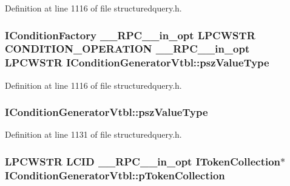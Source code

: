 Definition at line 1116 of file structuredquery.\+h.

\subsubsection[{\texorpdfstring{psz\+Value\+Type}{pszValueType}}]{ {\bf I\+Condition\+Factory} {\bf \+\_\+\+\_\+\+R\+P\+C\+\_\+\+\_\+in\+\_\+opt} {\bf L\+P\+C\+W\+S\+TR} {\bf C\+O\+N\+D\+I\+T\+I\+O\+N\+\_\+\+O\+P\+E\+R\+A\+T\+I\+ON} {\bf \+\_\+\+\_\+\+R\+P\+C\+\_\+\+\_\+in\+\_\+opt} {\bf L\+P\+C\+W\+S\+TR} I\+Condition\+Generator\+Vtbl\+::psz\+Value\+Type}\hypertarget{struct_i_condition_generator_vtbl_a29506597320052d30bf9d055f81867a5}{}\label{struct_i_condition_generator_vtbl_a29506597320052d30bf9d055f81867a5}


Definition at line 1116 of file structuredquery.\+h.

\subsubsection[{\texorpdfstring{psz\+Value\+Type}{pszValueType}}]{ I\+Condition\+Generator\+Vtbl\+::psz\+Value\+Type}\hypertarget{struct_i_condition_generator_vtbl_a4b4ea78570ce5ec535d6743fb3774d01}{}\label{struct_i_condition_generator_vtbl_a4b4ea78570ce5ec535d6743fb3774d01}


Definition at line 1131 of file structuredquery.\+h.

\subsubsection[{\texorpdfstring{p\+Token\+Collection}{pTokenCollection}}]{ {\bf L\+P\+C\+W\+S\+TR} {\bf L\+C\+ID} {\bf \+\_\+\+\_\+\+R\+P\+C\+\_\+\+\_\+in\+\_\+opt} {\bf I\+Token\+Collection}$\ast$ I\+Condition\+Generator\+Vtbl\+::p\+Token\+Collection}\hypertarget{struct_i_condition_generator_vtbl_a7d60355ecfbbc069adb46708e36deb71}{}\label{struct_i_condition_generator_vtbl_a7d60355ecfbbc069adb46708e36deb71}


